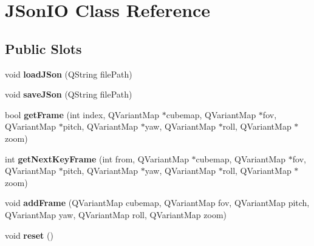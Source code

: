 \hypertarget{class_j_son_i_o}{
\section{\-J\-Son\-I\-O \-Class \-Reference}
\label{class_j_son_i_o}
}
\subsection*{\-Public \-Slots}
\begin{DoxyCompactItemize}
\item 
\hypertarget{class_j_son_i_o_a9e1062cdcfbf92bdfd02f1309c3733d7}{
void {\bfseries load\-J\-Son} (\-Q\-String file\-Path)}
\label{class_j_son_i_o_a9e1062cdcfbf92bdfd02f1309c3733d7}

\item 
\hypertarget{class_j_son_i_o_a864b89888f6be9fa4be2b2edfbbb5be1}{
void {\bfseries save\-J\-Son} (\-Q\-String file\-Path)}
\label{class_j_son_i_o_a864b89888f6be9fa4be2b2edfbbb5be1}

\item 
\hypertarget{class_j_son_i_o_a0c15f621007bb68f05df637770a8740f}{
bool {\bfseries get\-Frame} (int index, \-Q\-Variant\-Map $\ast$cubemap, \-Q\-Variant\-Map $\ast$fov, \-Q\-Variant\-Map $\ast$pitch, \-Q\-Variant\-Map $\ast$yaw, \-Q\-Variant\-Map $\ast$roll, \-Q\-Variant\-Map $\ast$zoom)}
\label{class_j_son_i_o_a0c15f621007bb68f05df637770a8740f}

\item 
\hypertarget{class_j_son_i_o_a38be0f818299561f4e8a9beb0e48749f}{
int {\bfseries get\-Next\-Key\-Frame} (int from, \-Q\-Variant\-Map $\ast$cubemap, \-Q\-Variant\-Map $\ast$fov, \-Q\-Variant\-Map $\ast$pitch, \-Q\-Variant\-Map $\ast$yaw, \-Q\-Variant\-Map $\ast$roll, \-Q\-Variant\-Map $\ast$zoom)}
\label{class_j_son_i_o_a38be0f818299561f4e8a9beb0e48749f}

\item 
\hypertarget{class_j_son_i_o_aa1449b63224a93732c7a1ce99223573d}{
void {\bfseries add\-Frame} (\-Q\-Variant\-Map cubemap, \-Q\-Variant\-Map fov, \-Q\-Variant\-Map pitch, \-Q\-Variant\-Map yaw, \-Q\-Variant\-Map roll, \-Q\-Variant\-Map zoom)}
\label{class_j_son_i_o_aa1449b63224a93732c7a1ce99223573d}

\item 
\hypertarget{class_j_son_i_o_a3cfcb4dc29e47973ea63cd54df632caa}{
void {\bfseries reset} ()}
\label{class_j_son_i_o_a3cfcb4dc29e47973ea63cd54df632caa}

\end{DoxyCompactItemize}
